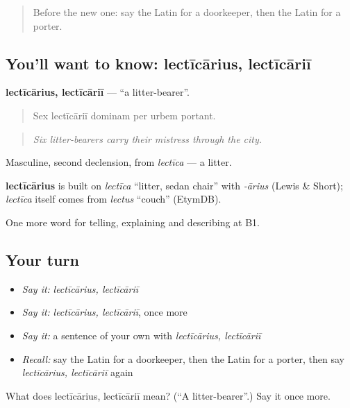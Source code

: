 \begin{quote}
Before the new one: say the Latin for a doorkeeper, then the Latin for a porter.
\end{quote}

\subsection*{You'll want to know: lectīcārius, lectīcāriī}
\textbf{lectīcārius, lectīcāriī} — \textquotedblleft{}a litter-bearer\textquotedblright{}.

\begin{quote}
Sex lectīcāriī dominam per urbem portant.
\end{quote}

\begin{quote}
\emph{Six litter-bearers carry their mistress through the city.}
\end{quote}

Masculine, second declension, from \emph{lectīca} — a litter.

\begin{cousinweb}
\textbf{lectīcārius} is built on \emph{lectīca} \textquotedblleft{}litter, sedan chair\textquotedblright{} with \emph{-ārius} (Lewis \& Short); \emph{lectīca} itself comes from \emph{lectus} \textquotedblleft{}couch\textquotedblright{} (EtymDB).
\end{cousinweb}

\begin{grammarlens}[title={What you've built}]
One more word for telling, explaining and describing at B1.
\end{grammarlens}

\subsection*{Your turn}
\begin{itemize}
\raggedright
  \item \emph{Say it:} \emph{lectīcārius, lectīcāriī}
  \item \emph{Say it:} \emph{lectīcārius, lectīcāriī}, once more
  \item \emph{Say it:} a sentence of your own with \emph{lectīcārius, lectīcāriī}
  \item \emph{Recall:} say the Latin for a doorkeeper, then the Latin for a porter, then say \emph{lectīcārius, lectīcāriī} again
\end{itemize}

\begin{tcolorbox}[breakable,colback=teal!4,colframe=teal!35!black,title={Before you move on}]
What does lectīcārius, lectīcāriī mean? (\textquotedblleft{}A litter-bearer\textquotedblright{}.) Say it once more.
\end{tcolorbox}

